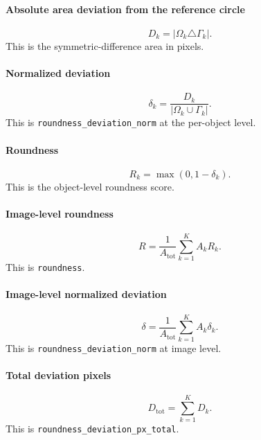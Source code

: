 \documentclass[11pt]{article}
\newcommand{\1}{\mathbf{1}}
\newcommand{\symdiff}{\triangle}
\begin{document}
\paragraph{Absolute area deviation from the reference circle}
\begin{equation}
D_k = |\Omega_k \symdiff \Gamma_k|.
\end{equation}
This is the symmetric-difference area in pixels.

\paragraph{Normalized deviation}
\begin{equation}
\delta_k = \frac{D_k}{|\Omega_k \cup \Gamma_k|}.
\end{equation}
This is \texttt{roundness\_deviation\_norm} at the per-object level.

\paragraph{Roundness}
\begin{equation}
R_k = \max(0, 1-\delta_k).
\end{equation}
This is the object-level roundness score.

\paragraph{Image-level roundness}
\begin{equation}
R = \frac{1}{A_{\mathrm{tot}}}\sum_{k=1}^{K} A_k R_k.
\end{equation}
This is \texttt{roundness}.

\paragraph{Image-level normalized deviation}
\begin{equation}
\delta = \frac{1}{A_{\mathrm{tot}}}\sum_{k=1}^{K} A_k\delta_k.
\end{equation}
This is \texttt{roundness\_deviation\_norm} at image level.

\paragraph{Total deviation pixels}
\begin{equation}
D_{\mathrm{tot}} = \sum_{k=1}^{K} D_k.
\end{equation}
This is \texttt{roundness\_deviation\_px\_total}.
\end{document}
